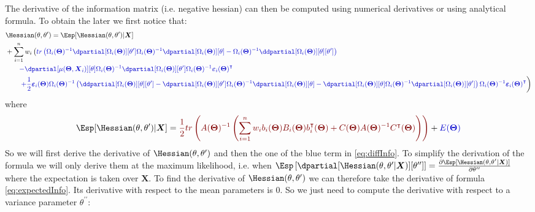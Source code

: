 \documentclass[12pt]{article}
\newcommand{\darkblue}{blue!80!black}
\newcommand{\darkred}{red!50!black}
\newcommand\trans[1]{{#1}^\intercal}%
\newcommand{\param}{\Theta}
\newcommand{\Vparam}{\boldsymbol{\param}}
\newcommand{\VX}{\boldsymbol{X}}
\newcommand{\Vvarepsilon}{\boldsymbol{\varepsilon}}
\begin{document}
The derivative of the information matrix (i.e. negative hessian) can
then be computed using numerical derivatives or using analytical
formula. To obtain the later we first notice that:
\begin{align}
&\Hessian(\theta,\theta^{\prime}) = \Esp[\Hessian(\theta,\theta^{\prime})|\VX] \notag \\
& + \sum_{i=1}^n  w_i \left( \textcolor{\darkblue}{ tr\left(\Omega_i(\Vparam)^{-1} \dpartial[\Omega_i(\Vparam)][\theta^{\prime}] \Omega_i(\Vparam)^{-1} \dpartial[\Omega_i(\Vparam)][\theta] - \Omega_i(\Vparam)^{-1} \ddpartial[\Omega_i(\Vparam)][\theta][\theta^{\prime}] \right) } \right. \notag \\
& \qquad \textcolor{\darkblue}{ -  \dpartial[\mu(\Vparam,\VX_i)][\theta] \Omega_i(\Vparam)^{-1} \dpartial[\Omega_i(\Vparam)][\theta^{\prime}] \Omega_i(\Vparam)^{-1} \trans{\Vvarepsilon_i(\Vparam)}} \notag \\
& \qquad \left. \textcolor{\darkblue}{ + \frac{1}{2} \Vvarepsilon_i(\Vparam) \Omega_i(\Vparam)^{-1} \left(\ddpartial[\Omega_i(\Vparam)][\theta][\theta^{\prime}] - \dpartial[\Omega_i(\Vparam)][\theta^{\prime}] \Omega_i(\Vparam)^{-1} \dpartial[\Omega_i(\Vparam)][\theta] - \dpartial[\Omega_i(\Vparam)][\theta] \Omega_i(\Vparam)^{-1} \dpartial[\Omega_i(\Vparam)][\theta^{\prime}] \right) \Omega_i(\Vparam)^{-1} \trans{\Vvarepsilon_i(\Vparam)} } \right) \label{eq:diffInfo}
\end{align}
where
\[  \Esp[\Hessian(\theta,\theta^{\prime})|\VX] = \textcolor{\darkred}{\frac{1}{2} tr \left(A(\Vparam)^{-1} \left(\sum_{i=1}^n w_i b_i(\Vparam) B_i(\Vparam) \trans{b}_i(\Vparam) + C(\Vparam)A(\Vparam)^{-1} \trans{C}(\Vparam) \right)\right)}
 + \textcolor{\darkblue}{E(\Vparam)}
\]
So we will first derive the derivative of
\(\Hessian(\theta,\theta^{\prime})\) and then the one of the blue term
in \autoref{eq:diffInfo}.  To simplify the derivation of the
formula we will only derive them at the maximum likelihood, i.e. when
\(\Esp\left[\dpartial[\Hessian(\theta,\theta^{\prime}|\VX)][\theta^{\prime\prime}]\right]=\frac{\partial
\Esp[\Hessian(\theta,\theta^{\prime}|\VX)]}{\partial
\theta^{\prime\prime}}\) where the expectation is taken over
\(\VX\). To find the derivative of
\(\Hessian(\theta,\theta^{\prime})\) we can therefore take the
derivative of formula \eqref{eq:expectedInfo}. Its derivative with respect
to the mean parameters is 0. So we just need to compute the derivative
with respect to a variance parameter \(\theta^{\prime\prime}\):
\end{document}
